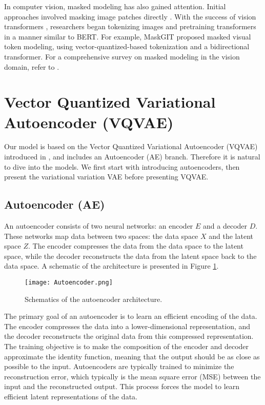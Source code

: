 \documentclass[../../thesis.tex]{subfiles}
\begin{document}
In computer vision, masked modeling has also gained attention. Initial approaches involved masking image patches directly \cite{he2021masked}. With the success of vision transformers \cite{dosovitskiy2021image}, researchers began tokenizing images and pretraining transformers in a manner similar to BERT. For example, MaskGIT \cite{chang2022maskgit} proposed masked visual token modeling, using vector-quantized-based tokenization and a bidirectional transformer. For a comprehensive survey on masked modeling in the vision domain, refer to \cite{li2024masked}.

\section{Vector Quantized Variational Autoencoder (VQVAE)}
\label{section:VQVAE}
Our model is based on the Vector Quantized Variational Autoencoder (VQVAE) introduced in \cite{VQVAE}, and includes an Autoencoder (AE) branch. Therefore it is natural to dive into the models. We first start with introducing autoencoders, then present the variational variation VAE before presenting VQVAE. 

\subsection{Autoencoder (AE)}

An autoencoder consists of two neural networks: an encoder $E$ and a decoder $D$. These networks map data between two spaces: the data space $X$ and the latent space $Z$. The encoder compresses the data from the data space to the latent space, while the decoder reconstructs the data from the latent space back to the data space. A schematic of the architecture is presented in Figure \ref{fig:autoencoder}. \newline

\begin{figure}[h]
    \texttt{[image: Autoencoder.png]}
    \centering
    \caption{Schematics of the autoencoder architecture.}
    \label{fig:autoencoder}
\end{figure}

The primary goal of an autoencoder is to learn an efficient encoding of the data. The encoder compresses the data into a lower-dimensional representation, and the decoder reconstructs the original data from this compressed representation. The training objective is to make the composition of the encoder and decoder approximate the identity function, meaning that the output should be as close as possible to the input. Autoencoders are typically trained to minimize the reconstruction error, which typically is the mean square error (MSE) between the input and the reconstructed output. This process forces the model to learn efficient latent representations of the data.\newline
\end{document}
